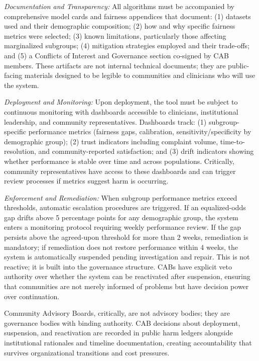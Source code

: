 \documentclass[12pt,letterpaper]{article}
\begin{document}
\textit{Documentation and Transparency:} All algorithms must be accompanied by comprehensive model cards and fairness appendices that document: (1) datasets used and their demographic composition; (2) how and why specific fairness metrics were selected; (3) known limitations, particularly those affecting marginalized subgroups; (4) mitigation strategies employed and their trade-offs; and (5) a Conflicts of Interest and Governance section co-signed by CAB members.\cite{chen2023} These artifacts are not internal technical documents; they are public-facing materials designed to be legible to communities and clinicians who will use the system.\cite{lekadir2025}

\textit{Deployment and Monitoring:} Upon deployment, the tool must be subject to continuous monitoring with dashboards accessible to clinicians, institutional leadership, and community representatives. Dashboards track: (1) subgroup-specific performance metrics (fairness gaps, calibration, sensitivity/specificity by demographic group); (2) trust indicators including complaint volume, time-to-resolution, and community-reported satisfaction; and (3) drift indicators showing whether performance is stable over time and across populations.\cite{sagona2025} Critically, community representatives have access to these dashboards and can trigger review processes if metrics suggest harm is occurring.

\textit{Enforcement and Remediation:} When subgroup performance metrics exceed thresholds, automatic escalation procedures are triggered. If an equalized-odds gap drifts above 5 percentage points for any demographic group, the system enters a monitoring protocol requiring weekly performance review. If the gap persists above the agreed-upon threshold for more than 2 weeks, remediation is mandatory; if remediation does not restore performance within 4 weeks, the system is automatically suspended pending investigation and repair.\cite{chen2023} This is not reactive; it is built into the governance structure. CABs have explicit veto authority over whether the system can be reactivated after suspension, ensuring that communities are not merely informed of problems but have decision power over continuation.

Community Advisory Boards, critically, are not advisory bodies; they are governance bodies with binding authority. CAB decisions about deployment, suspension, and reactivation are recorded in public harm ledgers alongside institutional rationales and timeline documentation, creating accountability that survives organizational transitions and cost pressures.\cite{sagona2025}
\end{document}

